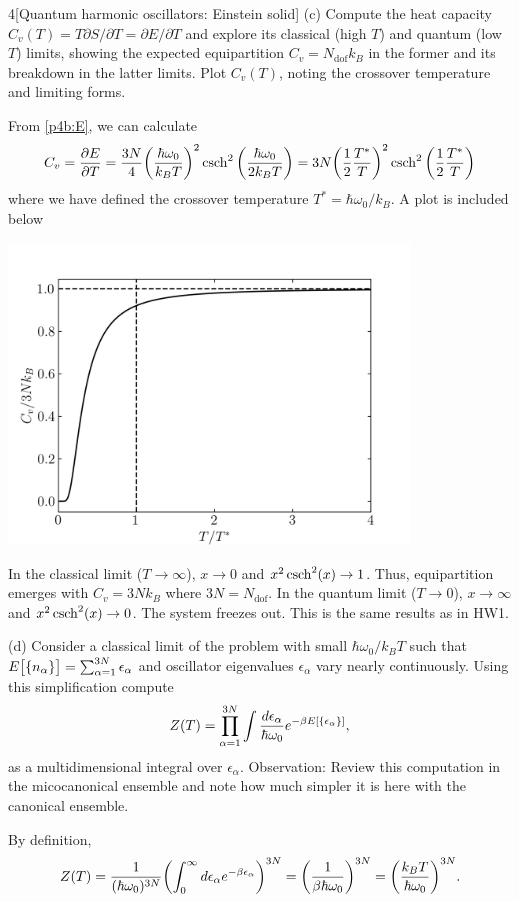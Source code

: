 \documentclass[12pt]{article}
\begin{document}
\begin{problem}{4}[Quantum harmonic oscillators: Einstein solid]
(c) Compute the heat capacity $C_v(T)=T\partial S/\partial T=\partial E/\partial
T$ and explore its classical (high $T$) and quantum (low $T$) limits, showing
the expected equipartition $C_v=N_\text{dof}k_B$ in the former and its breakdown
in the latter limits. Plot $C_v(T)$, noting the crossover temperature and
limiting forms.
\begin{solution}
From \eqref{p4b:E}, we can calculate
\begin{equation}
    C_v=\frac{\partial E}{\partial T}
    =\frac{3N}{4}\qty(\frac{\hbar\omega_0}{k_BT})^2\csch^2\qty(\frac{\hbar\omega_0}{2k_BT})
=3N\qty(\frac12\frac{T^\ast}{T})^2\csch^2\qty(\frac12\frac{T^\ast}{T})
\end{equation}
where we have defined the crossover temperature $T^\ast=\hbar\omega_0/k_B$. A
plot is included below
\begin{center}
    \includegraphics[width=0.8\textwidth]{p4c.png} 
\end{center}
In the classical limit ($T\to\infty$), $x\to0$ and $x^2\csch^2(x)\to1$.
Thus, equipartition emerges with $C_v=3Nk_B$ where $3N=N_\text{dof}$. In the
quantum limit ($T\to0$), $x\to\infty$ and $x^2\csch^2(x)\to0$. The system
freezes out. This is the same results as in HW1.
\end{solution}

(d) Consider a classical limit of the problem with small $\hbar\omega_0/k_BT$
such that $E\qty[\qty{n_\alpha}]=\sum_{\alpha=1}^{3N}\epsilon_\alpha$ and
oscillator eigenvalues $\epsilon_\alpha$ vary nearly continuously. Using this
simplification compute
\begin{equation}
    Z(T)=\prod_{\alpha=1}^{3N}\int\frac{d\epsilon_\alpha}{\hbar\omega_0}e^{-\beta
    E[\qty{\epsilon_\alpha}]}, 
\end{equation}
as a multidimensional integral over $\epsilon_\alpha$. Observation: Review this
computation in the micocanonical ensemble and note how much simpler it is here
with the canonical ensemble.
\begin{solution}
By definition,
\begin{align}\label{p4d:Z}
    Z(T)
    =\frac1{(\hbar\omega_0)^{3N}}\qty(\int_0^\infty d\epsilon_\alpha
    e^{-\beta\epsilon_\alpha})^{3N}
    =\qty(\frac1{\beta\hbar\omega_0})^{3N}
    =\qty(\frac{k_BT}{\hbar\omega_0})^{3N}.
\end{align}
\end{solution}


\end{problem}
\end{document}
